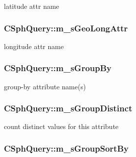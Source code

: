 latitude attr name 

\hypertarget{classCSphQuery_a30f3f434382a8160ab7536bbb760f418}{
\subsubsection[{m\-\_\-s\-Geo\-Long\-Attr}]{ C\-Sph\-Query\-::m\-\_\-s\-Geo\-Long\-Attr}}\label{classCSphQuery_a30f3f434382a8160ab7536bbb760f418}


longitude attr name 

\hypertarget{classCSphQuery_a203ace139c1feadd62f726a682527395}{
\subsubsection[{m\-\_\-s\-Group\-By}]{ C\-Sph\-Query\-::m\-\_\-s\-Group\-By}}\label{classCSphQuery_a203ace139c1feadd62f726a682527395}


group-\/by attribute name(s) 

\hypertarget{classCSphQuery_ac3cb46ce8599772486bbc7a49aac0fb3}{
\subsubsection[{m\-\_\-s\-Group\-Distinct}]{ C\-Sph\-Query\-::m\-\_\-s\-Group\-Distinct}}\label{classCSphQuery_ac3cb46ce8599772486bbc7a49aac0fb3}


count distinct values for this attribute 

\hypertarget{classCSphQuery_ab15fa0d113e9aa216ffeb96a8d89ce2f}{
\subsubsection[{m\-\_\-s\-Group\-Sort\-By}]{ C\-Sph\-Query\-::m\-\_\-s\-Group\-Sort\-By}}\label{classCSphQuery_ab15fa0d113e9aa216ffeb96a8d89ce2f}


